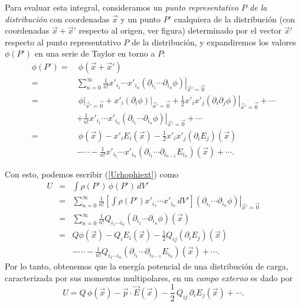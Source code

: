 Para evaluar esta integral, consideramos un \textit{punto representativo $P$ de la
distribución} con coordenadas $\vec{x}$ y un punto $P'$ cualquiera de la
distribución  (con coordenadas $\vec{x}+\vec{x}'$ respecto
al origen, ver figura) determinado por el vector $\vec{x}'$ respecto al punto
representativo $P$ de la distribución, y expandiremos los valores $\phi(P')$ en
una serie de Taylor en torno a $P$:
\begin{align} \label{eq3.3.3}
\phi(P') = &\ \phi(\vec{x}+\vec{x}')\\
= & \sum_{n=0}^\infty\frac{1}{n!}x'_{i_1}\cdots
x'_{i_n}\left.(\partial_{i_1}\cdots\partial_{i_n}\phi)\right|_{\vec{x}'=\vec{0}} \\
= &\ \left.\phi\right|_{\vec{x}'=\vec{0}}+x'_i\left.(\partial_i\phi)\right|_{\vec{
x}'=\vec{0}}+\frac{1}{2}x'_ix'_j\left.(\partial_i\partial_j\phi)\right|_{\vec{x}
'=\vec{0}}+\cdots \nonumber\\
& +\frac{1}{n!}x'_{i_1}\cdots
x'_{i_n}\left.(\partial_{i_1}\cdots\partial_{i_n}\phi)\right|_{\vec{x}'=\vec{0}}
+\cdots\\
= &\ \phi(\vec{x})-x'_iE_i(\vec{x})-\frac{1}{2}x'_ix'_j(\partial_iE_j)(\vec{x}
) \nonumber \\
& -\cdots-\frac{1}{n!}x'_{i_1}\cdots
x'_{i_n}(\partial_{i_1}\cdots\partial_{i_{n-1}}E_{i_n})(\vec{x})+\cdots .
\end{align}

Con esto, podemos escribir (\ref{Urhophiext}) como
\begin{eqnarray}
 U&=&\int\rho(P')\,\phi(P')\,dV'\\
&=&\sum_{n=0}^\infty\frac{1}{n!}\left[\int\rho(P')x'_{i_1}\cdots
x'_{i_n}\,dV'\right]\left.(\partial_{i_1}\cdots\partial_{i_n}\phi)\right|_{\vec{x}'=\vec{0}}\\
&=&\sum_{n=0}^\infty\frac{1}{n!}Q_{i_1\cdots i_n}(\partial_{i_1}\cdots\partial_{i_n}\phi)(\vec{x})\\
&=&Q\phi(\vec{x})-Q_iE_i(\vec{x})-\frac{1}{2}
Q_{ij}(\partial_iE_j)(\vec{x}) \nonumber \\
&& -\cdots-\frac{1}{n!}Q_{i_1\cdots i_n}(\partial_{i_1}
\cdots\partial_{i_{n-1}}E_{i_n})(\vec{x})+\cdots .
\end{eqnarray}
Por lo tanto, obtenemos que la energía potencial de una distribución de
carga, caracterizada por sus momentos multipolares, en un \textit{campo externo}
es dado por
\begin{equation} \label{eq3.3.4}
\boxed{U=Q\,\phi(\vec{x})-\vec{p}\cdot\vec{E}(\vec{x})-\frac{1}{2}\,Q_{ij}
\,\partial_iE_j(\vec{x})+\cdots .}
\end{equation}

